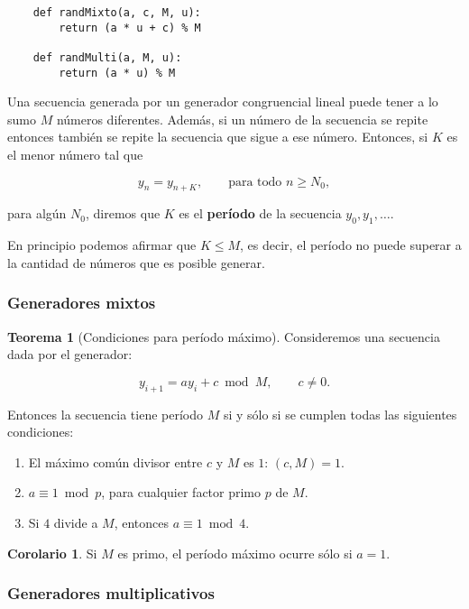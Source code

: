 \documentclass[11pt, a4paper]{article}
\theoremstyle{definition}
\newtheorem{theorem}{Teorema}
\newtheorem{corollary}{Corolario}
\begin{document}
\begin{verbatim}
    def randMixto(a, c, M, u):
        return (a * u + c) % M
    
    def randMulti(a, M, u):
        return (a * u) % M
    \end{verbatim}
  
    Una secuencia generada por un generador congruencial lineal puede tener a lo sumo $M$ números diferentes. Además, si un número de la secuencia se repite entonces también se repite la secuencia que sigue a ese número. Entonces, si $K$ es el menor número tal que
    
    \[
    y_{n} = y_{n+K}, \qquad \text{para todo } n \geq N_{0},
    \]
    
    para algún $N_{0}$, diremos que $K$ es el \textbf{período} de la secuencia $y_{0}, y_{1}, \ldots$.
    
    En principio podemos afirmar que $K \leq M$, es decir, el período no puede superar a la cantidad de números que es posible generar.


\subsubsection{Generadores mixtos}
\begin{theorem}[Condiciones para período máximo]
    Consideremos una secuencia dada por el generador:
    
    \[
    y_{i+1} = a y_{i} + c \bmod M, \qquad c \neq 0.
    \]
    
    Entonces la secuencia tiene período $M$ si y sólo si se cumplen todas las siguientes condiciones:
    
    \begin{enumerate}
        \item El máximo común divisor entre $c$ y $M$ es $1$: $(c,M)=1$.
        
        \item $a \equiv 1 \bmod p$, para cualquier factor primo $p$ de $M$.
        
        \item Si $4$ divide a $M$, entonces $a \equiv 1 \bmod 4$.
    \end{enumerate}
    \end{theorem}

\begin{corollary}
    Si $M$ es primo, el período máximo ocurre sólo si $a = 1$.
\end{corollary}


\subsubsection{Generadores multiplicativos}
\end{document}
